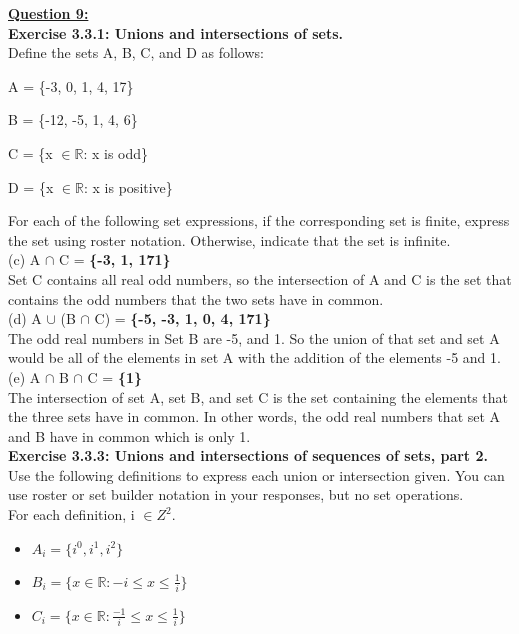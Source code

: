 \documentclass[12pt, letterpaper, twoside]{article}
\begin{document}
\newpage
\noindent \textbf{\underline{Question 9:}}\\
\textbf{Exercise 3.3.1: Unions and intersections of sets.}\\
Define the sets A, B, C, and D as follows:
\begin{description}[noitemsep,topsep=0pt]
\item A = \{-3, 0, 1, 4, 17\}
\item B = \{-12, -5, 1, 4, 6\}
\item C = \{x $\in \mathbb{R}$: x is odd\}
\item D = \{x $\in \mathbb{R}$: x is positive\}
\end{description}
For each of the following set expressions, if the corresponding set is finite, express the set using roster notation. Otherwise, indicate that the set is infinite.\\
\break
(c) A $\cap$ C = \textbf{\{-3, 1, 171\}}\\
Set C contains all real odd numbers, so the intersection of A and C is the set that contains the odd numbers that the two sets have in common.\\
\break
(d) A $\cup$ (B $\cap$ C) = \textbf{\{-5, -3, 1, 0, 4, 171\}}\\
The odd real numbers in Set B are -5, and 1. So the union of that set and set A would be all of the elements in set A with the addition of the elements -5 and 1.\\
\break
(e) A $\cap$ B $\cap$ C = \textbf{\{1\}}\\
The intersection of set A, set B, and set C is the set containing the elements that the three sets have in common. In other words, the odd real numbers that set A and B have in common which is only 1.\\
\break
\newpage
\noindent \textbf{Exercise 3.3.3: Unions and intersections of sequences of sets, part 2.}\\
Use the following definitions to express each union or intersection given. You can use roster or set builder notation in your responses, but no set operations. \\
For each definition, i $\in Z^2$.
\begin{itemize}[noitemsep]
\item $A_{i} = \{i^0, i^1, i^2\}$
\item $B_{i} = \{x \in \mathbb{R}: -i \leq x \leq \frac{1}{i}\}$
\item $C_{i} = \{x \in \mathbb{R}: \frac{-1}{i} \leq x \leq \frac{1}{i}\}$
\end{itemize}
\end{document}
